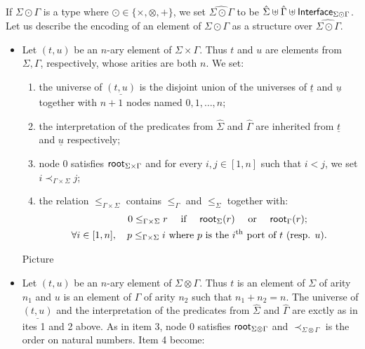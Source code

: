     If $\Sigma \odot \Gamma$ is a type where $\odot \in \{\times, \otimes,+\}$, we set $\widehat{\Sigma\odot\Gamma}$ to be $\hat{\Sigma} \uplus \hat{\Gamma} \uplus \mathsf{Interface}_{\Sigma\odot\Gamma}$. Let us describe the encoding of an element of $\Sigma \odot \Gamma$ as a structure over $\widehat{\Sigma\odot\Gamma}$.
     \begin{itemize}
\item Let $(t,u)$ be an $n$-ary element of $\Sigma \times \Gamma$. Thus $t$ and $u$ are elements from $\Sigma, \Gamma$, respectively, whose arities are both $n$. We set:
        \begin{enumerate}
       \item the universe of $\underline{(t,u)}$ is the disjoint union of the universes of $\underline{t}$ and $\underline{u}$ together with $n+1$ nodes named $0,1,\dots, n$;
       \item the interpretation of the predicates from $\hat \Sigma$ and $\hat \Gamma$ are inherited from $\underline{t}$ and $\underline {u}$ respectively;
       \item node $0$ satisfies $\mathsf{root}_{\Sigma\times\Gamma}$ and for every $i,j \in[1,n]$ such that $i<j$, we set $i \prec_{\Gamma\times\Sigma} j$;
       \item the relation $\leq_{\Gamma\times\Sigma}$ contains   $\leq_{\Gamma}$ and $\leq_{\Sigma}$ together with:
\begin{align*}
0\leq_{\Gamma\times\Sigma} r \quad\text{ if } \quad \mathsf{root}_{\Sigma}(r) \quad\text{ or }\quad \mathsf{root}_{\Gamma}(r);\qquad\\
\forall i\in[1,n],\quad p \leq_{\Gamma\times\Sigma} i \text{ where } 
p \text{ is the } i^\text{th} \text{ port of } t \text{ (resp.  $u$)}.
\end{align*}  
        \end{enumerate}
        \begin{center}
        Picture
        \end{center}        
\item Let $(t,u)$ be an $n$-ary element of $\Sigma\otimes \Gamma$. Thus $t$ is an element of $\Sigma$ of arity $n_1$ and $u$ is an element of $\Gamma$ of arity $n_2$ such that $n_1+n_2=n$. The universe of $\underline{(t,u)}$ and the interpretation of the predicates from $\hat \Sigma$ and $\hat \Gamma$ are exctly as in ites 1 and 2 above. As in item 3, node $0$ satisfies $\mathsf{root}_{\Sigma\otimes \Gamma}$ and $\prec_{\Sigma\otimes \Gamma}$
       is the order on natural numbers. Item 4 become:
       \begin{enumerate}

\end{enumerate}
\end{itemize}
